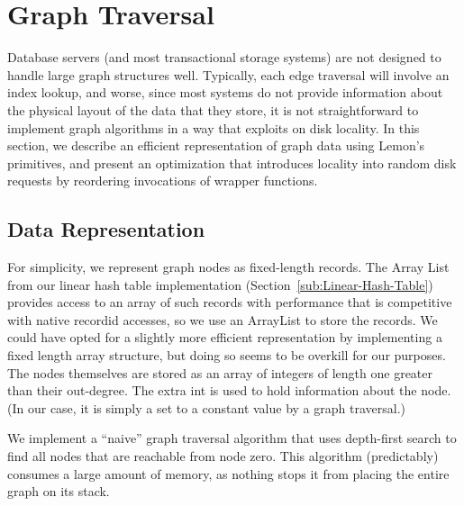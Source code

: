 \documentclass[10pt,letterpaper,twocolumn,english]{article}
\newcommand{\yad}{Lemon\xspace}
\begin{document}
%

\section{Graph Traversal\label{TransClos}}

Database servers (and most transactional storage systems) are not
designed to handle large graph structures well.  Typically, each edge
traversal will involve an index lookup, and worse, since most systems
do not provide information about the physical layout of the data that
they store, it is not straightforward to implement graph algorithms in
a way that exploits on disk locality.  In this section, we describe an
efficient representation of graph data using \yad's primitives, and
present an optimization that introduces locality into random disk
requests by reordering invocations of wrapper functions.

\subsection {Data Representation}

For simplicity, we represent graph nodes as
fixed-length records.  The Array List from our linear hash table
implementation (Section~\ref{sub:Linear-Hash-Table}) provides access to an
array of such records with performance that is competitive with native
recordid accesses, so we use an ArrayList to store the records.  We
could have opted for a slightly more efficient representation by
implementing a fixed length array structure, but doing so seems to be
overkill for our purposes.  The nodes themselves are stored as an
array of integers of length one greater than their out-degree. The
extra int is used to hold information about the node.  (In our case,
it is simply a set to a constant value by a graph traversal.)

We implement a ``naive'' graph traversal algorithm that uses depth-first search to find all nodes that are reachable from node zero.
This algorithm (predictably) consumes a large amount of memory, as
nothing stops it from placing the entire graph on its stack.  
\end{document}
